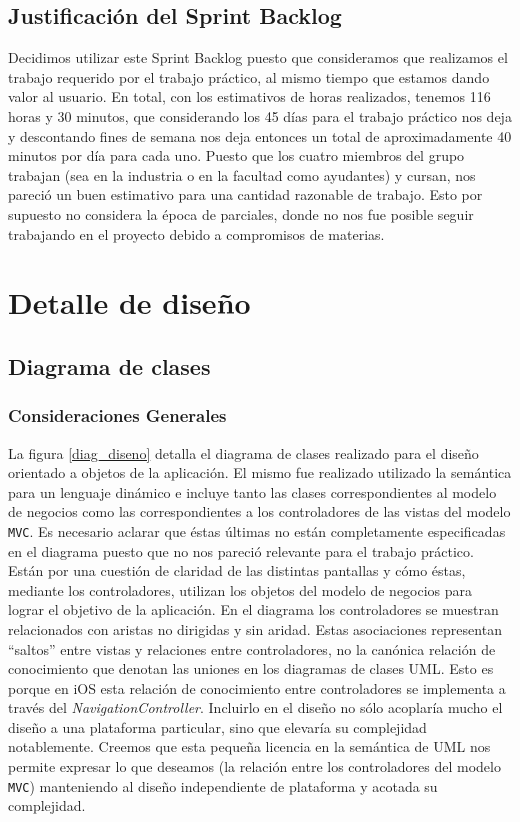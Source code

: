 \documentclass[10pt, a4paper,english,spanish]{article}
\renewcommand{\emph}[1]{\textit{#1}}
\begin{document}


\subsection{Justificación del Sprint Backlog}

Decidimos utilizar este Sprint Backlog puesto que consideramos que realizamos el trabajo requerido por el trabajo práctico, al mismo tiempo que estamos dando valor al usuario. En total, con los estimativos de horas realizados, tenemos 116 horas y 30 minutos,  que considerando los 45 días para el trabajo práctico nos deja y descontando fines de semana nos deja entonces un total de aproximadamente 40 minutos por día para cada uno. Puesto que los cuatro miembros del grupo trabajan (sea en la industria o en la facultad como ayudantes) y cursan, nos pareció un buen estimativo para una cantidad razonable de trabajo. Esto por supuesto no considera la época de parciales, donde no nos fue posible seguir trabajando en el proyecto debido a compromisos de materias.

\section{Detalle de diseño}

\subsection{Diagrama de clases}

\subsubsection{Consideraciones Generales}
La figura \ref{diag_diseno} detalla el diagrama de clases realizado para el diseño orientado a objetos de la aplicación. El mismo fue realizado utilizado la semántica para un lenguaje dinámico e incluye tanto las clases correspondientes al modelo de negocios como las correspondientes a los controladores de las vistas del modelo \texttt{MVC}. Es necesario aclarar que éstas últimas no están completamente especificadas en el diagrama puesto que no nos pareció relevante para el trabajo práctico. Están por una cuestión de claridad de las distintas pantallas y cómo éstas, mediante los controladores, utilizan los objetos del modelo de negocios para lograr el objetivo de la aplicación. En el diagrama los controladores se muestran relacionados con aristas no dirigidas y sin aridad. Estas asociaciones representan ``saltos'' entre vistas y relaciones entre controladores, no la canónica relación de conocimiento que denotan las uniones en los diagramas de clases UML. Esto es porque en iOS esta relación de conocimiento entre controladores se implementa a través del \emph{NavigationController}. Incluirlo en el diseño no sólo acoplaría mucho el diseño a una plataforma particular, sino que elevaría su complejidad notablemente. Creemos que esta pequeña licencia en la semántica de UML nos permite expresar lo que deseamos (la relación entre los controladores del modelo \texttt{MVC}) manteniendo al diseño independiente de plataforma y acotada su complejidad.
\end{document}
